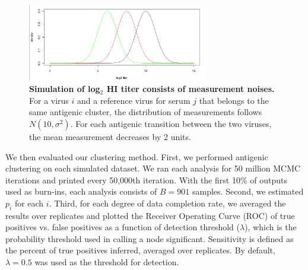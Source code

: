 \documentclass[11pt,oneside,letterpaper]{article}
\begin{document}
\begin{figure}[h]
	\centering		
	\includegraphics[width=0.7\textwidth]{figures/custom/simulationNoise}
	\caption{\textbf{Simulation of log$_2$ HI titer consists of measurement noises.} 
	 For a virus $i$ and a reference virus for serum $j$ that belongs to the same antigenic cluster, the distribution of measurements follows $N(10, \sigma^2)$. For each antigenic transition between the two viruses, the mean measurement decreases by 2 units.	
	 		} 
	\label{SimulationNoise} 
\end{figure}



We then evaluated our clustering method.
First, we performed antigenic clustering on each simulated dataset.
We ran each analysis for 50 million MCMC iterations and printed every 50,000th iteration.
With the first 10\% of outputs used as burn-ins, each analysis consists of $B=901$ samples.
Second, we estimated $p_i$ for each $i$.
Third, for each degree of data completion rate, we averaged the results over replicates and plotted the Receiver Operating Curve (ROC) of true positives vs. false positives as a function of detection threshold ($\lambda$), which is the probability threshold used in calling a node significant.
Sensitivity is defined as the percent of true positives inferred, averaged over replicates. By default, $\lambda=0.5$ was used as the threshold for detection.







\newpage




\end{document}
